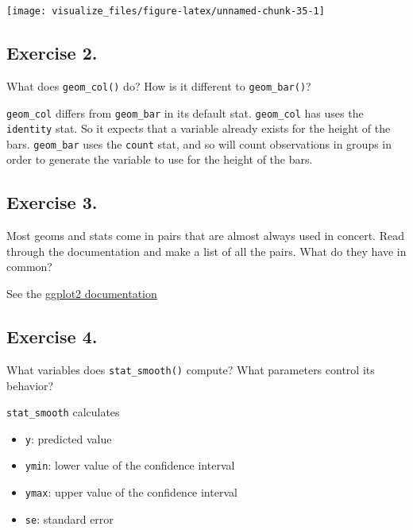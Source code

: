 \documentclass[]{book}
\providecommand{\tightlist}{%
  \setlength{\itemsep}{0pt}\setlength{\parskip}{0pt}}
\theoremstyle{definition}
\theoremstyle{definition}
\theoremstyle{definition}
\theoremstyle{remark}
\begin{document}
\begin{center}\texttt{[image: visualize\_files/figure-latex/unnamed-chunk-35-1]} \end{center}

\hypertarget{exercise-2.-4}{%
\subsection{Exercise 2.}\label{exercise-2.-4}}

What does \texttt{geom\_col()} do? How is it different to
\texttt{geom\_bar()}?

\texttt{geom\_col} differs from \texttt{geom\_bar} in its default stat.
\texttt{geom\_col} has uses the \texttt{identity} stat. So it expects
that a variable already exists for the height of the bars.
\texttt{geom\_bar} uses the \texttt{count} stat, and so will count
observations in groups in order to generate the variable to use for the
height of the bars.

\hypertarget{exercise-3.-4}{%
\subsection{Exercise 3.}\label{exercise-3.-4}}

Most geoms and stats come in pairs that are almost always used in
concert. Read through the documentation and make a list of all the
pairs. What do they have in common?

See the \href{http://docs.ggplot2.org/current/}{ggplot2 documentation}

\hypertarget{exercise-4.-3}{%
\subsection{Exercise 4.}\label{exercise-4.-3}}

What variables does \texttt{stat\_smooth()} compute? What parameters
control its behavior?

\texttt{stat\_smooth} calculates

\begin{itemize}
\tightlist
\item
  \texttt{y}: predicted value
\item
  \texttt{ymin}: lower value of the confidence interval
\item
  \texttt{ymax}: upper value of the confidence interval
\item
  \texttt{se}: standard error
\end{itemize}
\end{document}
